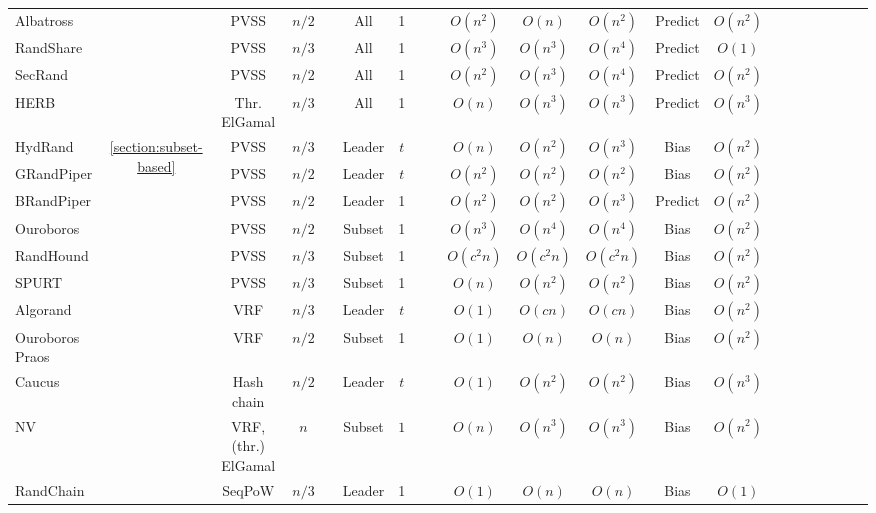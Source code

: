\documentclass[letterpaper,twocolumn,10pt]{article}
\newcommand{\cmark}{\ding{51}}
\newcommand{\xmark}{\ding{55}}
\theoremstyle{definition}
\theoremstyle{remark}
\begin{document}
\begin{table*}[pt]
\begin{threeparttable}
\begin{tabularx}{\textwidth}{@{} l *{20}c}
Albatross &  & PVSS & $n/2$   & \xmark   & All   & 1   & \cmark    & \cmark   & $O(n^2)$  & $O(n)$   & $O(n^2)$  & Predict & $O(n^2)$ \\ 
RandShare &  & PVSS & $n/3$   & \xmark   & All   & 1   & \cmark    & \cmark   & $O(n^3)$  & $O(n^3)$   & $O(n^4)$  & Predict & $O(1)$ \\ 
SecRand &  & PVSS &  $n/2$  & \xmark   & All   & 1   & \cmark    & \cmark   & $O(n^2)$  & $O(n^3)$   & $O(n^4)$  & Predict & $O(n^2)$ \\ 
HERB &  & Thr. ElGamal & $n/3$   & \xmark   & All   & 1   & \cmark    & \cmark   & $O(n)$  & $O(n^3)$   & $O(n^3)$  & Predict & $O(n^3)$ \\ 
\midrule
HydRand & \multirow{11}{*}{\ref{section:subset-based}} & PVSS & $n/3$   & \xmark   & Leader   & $t$   & \cmark    & \xmark   & $O(n)$  & $O(n^2)$   & $O(n^3)$  & Bias & $O(n^2)$ \\ 
GRandPiper &  & PVSS  & $n/2$   & \xmark   & Leader   & $t$   & \cmark    & \xmark   & $O(n^2)$  & $O(n^2)$   & $O(n^2)$  & Bias & $O(n^2)$ \\ 
BRandPiper &  & PVSS  & $n/2$   & \xmark   & Leader   & 1   & \cmark    & \xmark   & $O(n^2)$  & $O(n^2)$   & $O(n^3)$  & Predict & $O(n^2)$ \\ 
Ouroboros &  & PVSS & $n/2$   & \xmark   & Subset   & 1   & \cmark    & \xmark   & $O(n^3)$  & $O(n^4)$   & $O(n^4)$  & Bias & $O(n^2)$ \\ 
RandHound &  & PVSS & $n/3$   & \xmark   & Subset   & 1   & \xmark    & \xmark   & $O(c^2 n)$  & $O(c^2n)$   & $O(c^2n)$  & Bias & $O(n^2)$ \\ 
SPURT &  & PVSS  & $n/3$   & \xmark   & Subset   & 1   & \cmark    & \cmark   & $O(n)$  & $O(n^2)$   & $O(n^2)$  & Bias & $O(n^2)$ \\ 
Algorand &  & VRF  & $n/3$   & \cmark    & Leader   & $t$   & \xmark    & \cmark   & $O(1)$  & $O(cn)$   & $O(cn)$  & Bias & $O(n^2)$ \\ 
Ouroboros Praos &  & VRF & $n/2$   & \cmark    & Subset   & 1   & \xmark    & \cmark   & $O(1)$  & $O(n)$   & $O(n)$  & Bias & $O(n^2)$ \\ 
Caucus &  & Hash chain &  $n/2$  & \cmark    & Leader   & $t$   & \xmark    & \cmark   & $O(1)$  & $O(n^2)$   & $O(n^2)$  & Bias & $O(n^3)$ \\ 
NV &  & VRF, (thr.) ElGamal &  $n$  & \xmark   & Subset   & $1$   & \xmark    & \xmark   & $O(n)$  & $O(n^3)$   & $O(n^3)$  & Bias & $O(n^2)$ \\ 
RandChain &  & SeqPoW &  $n/3$  & \cmark    & Leader   &  1  & \xmark    & \cmark   & $O(1)$  & $O(n)$   & $O(n)$  & Bias &  $O(1)$\\ 

\end{tabularx}
\end{threeparttable}
\end{table*}
\end{document}
